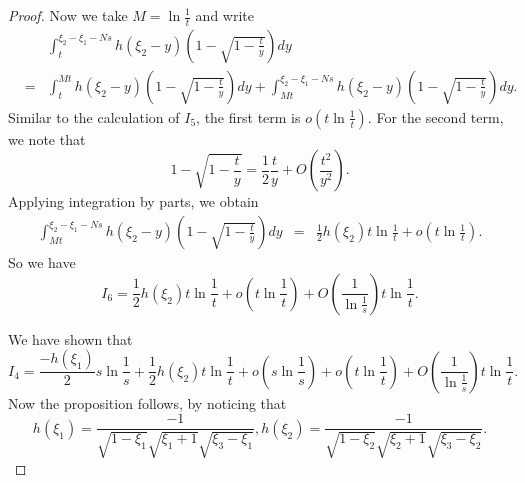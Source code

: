 \documentclass[11pt]{amsart}
\theoremstyle{plain}
\begin{document}
\begin{proof}
Now we take $M=\ln \frac{1}{t}$ and write 
\begin{eqnarray*}
&& \int_{t}^{\xi_2-\xi_1-Ns}  h(\xi_2-y)
 \left(1- \sqrt{1- \frac{t}{y}}\right)dy \\
 & =& \int_{t}^{Mt}  h(\xi_2-y)
 \left(1- \sqrt{1- \frac{t}{y}}\right)dy+ \int_{Mt}^{\xi_2-\xi_1-Ns}  h(\xi_2-y)
 \left(1- \sqrt{1- \frac{t}{y}}\right)dy.
\end{eqnarray*}
Similar to the calculation of  $I_5$, the first term is $o\left(t\ln\frac{1}{t}\right)$. For the second term, we note that 
$$1- \sqrt{1- \frac{t}{y}} =  \frac{1}{2} \frac{t}{y} + O\left(  \frac{t^2}{y^2}\right).$$
Applying integration by parts, we obtain 
\begin{eqnarray*}
\int_{Mt}^{\xi_2-\xi_1-Ns}  h(\xi_2-y)
 \left(1- \sqrt{1- \frac{t}{y}}\right)dy &=& \frac{1}{2}h(\xi_2) t\ln\frac{1}{t}+ o\left(t\ln\frac{1}{t}\right).
\end{eqnarray*}
So we have 
$$I_6= \frac{1}{2}h(\xi_2) t \ln \frac{1}{t} + o(t\ln\frac{1}{t})+ O\left( \frac{1}{\ln\frac{1}{s}}\right) t\ln\frac{1}{t}.$$

We have shown that 
$$I_4= \frac{-h(\xi_1)}{2}s\ln \frac{1}{s}+ \frac{1}{2}h(\xi_2) t\ln\frac{1}{t}+ o\left(s\ln \frac{1}{s}\right)+o\left(t\ln\frac{1}{t}\right)+O\left( \frac{1}{\ln\frac{1}{s}}\right) t\ln\frac{1}{t}.$$
Now the proposition follows,  by noticing that $$h(\xi_1)=\frac{-1}{\sqrt{1-\xi_1}\sqrt{\xi_1+1}\sqrt{\xi_3-\xi_1}},h(\xi_2)= \frac{-1}{\sqrt{1-\xi_2}\sqrt{\xi_2+1}\sqrt{\xi_3-\xi_2}}.$$
\end{proof}
\end{document}
